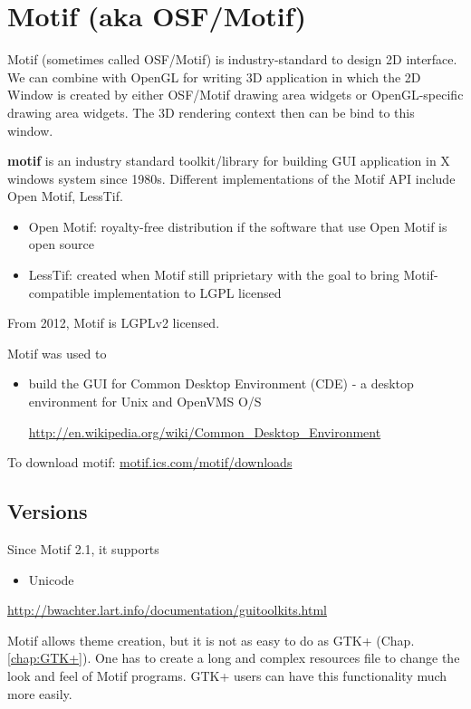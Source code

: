 \chapter{Motif (aka OSF/Motif)}
\label{chap:Motif}
\label{chap:osfmotif}

Motif (sometimes called OSF/Motif) is industry-standard to design 2D interface.
We can combine with OpenGL for writing 3D application in which the 2D Window is
created by either OSF/Motif drawing area widgets or OpenGL-specific drawing area
widgets. The 3D rendering context then can be bind to this window.

{\bf motif} is an industry standard toolkit/library for building GUI application
in X windows system since 1980s. Different implementations of the Motif API include Open
Motif, LessTif. 
\begin{itemize}
  \item Open Motif: royalty-free distribution if the software that use Open Motif is open source
  
  \item LessTif: created when Motif still priprietary with the goal to bring Motif-compatible implementation to LGPL licensed
\end{itemize}
From 2012, Motif is LGPLv2 licensed.

Motif was used to
\begin{itemize}
  \item build the GUI for Common Desktop Environment (CDE) - a desktop environment for Unix and OpenVMS O/S
  
  \url{http://en.wikipedia.org/wiki/Common_Desktop_Environment}
  
  
\end{itemize}  


To download motif: \url{motif.ics.com/motif/downloads}

\section{Versions}


Since Motif 2.1, it supports
\begin{itemize}
  \item Unicode
\end{itemize}


\url{http://bwachter.lart.info/documentation/guitoolkits.html}


Motif allows theme creation, but it is not as easy to do as GTK+ (Chap.\ref{chap:GTK+}). One has to
create a long and complex resources file to change the look and feel of Motif
programs. GTK+ users can have this functionality much more easily.


